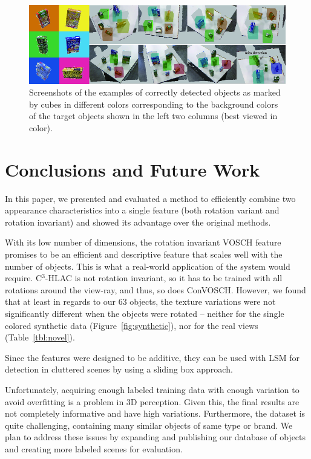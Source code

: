 \documentclass[a4paper, 10 pt, conference]{sty/ieeeconf}
\begin{document}
\begin{figure}[tb!]
  \centering
  \includegraphics[width=.99\textwidth]{figures/detection_demo/four_objects_detection.png}
  \caption{Screenshots of the examples of correctly detected objects as marked by cubes in different colors corresponding to the background colors of the target objects shown in the left two columns (best viewed in color). }
  \label{fig:correct_detected}
\end{figure}



\section{Conclusions and Future Work}
\label{sec:conclusion}

In this paper, we presented and evaluated a method to efficiently combine two
appearance characteristics into a single feature (both rotation
variant and rotation invariant) and showed its advantage over
the original methods.

With its low number of dimensions, the rotation invariant VOSCH feature
promises to be an efficient and descriptive feature that scales well with
the number of objects. This is what a real-world application of the system would
require. C$^3$-HLAC is not rotation invariant, so it has to be trained with
all rotations around the view-ray, and thus, so does ConVOSCH.
However, we found that at least in regards to our 63 objects, the texture variations
were not significantly different when the objects were rotated
-- neither for the single colored synthetic data (Figure~\ref{fig:synthetic}),
nor for the real views (Table~\ref{tbl:novel}).

Since the features were designed to be additive, they can be used with LSM for
detection in cluttered scenes by using a sliding box approach.

Unfortunately, acquiring enough labeled training data with enough variation
to avoid overfitting is a problem in 3D perception. Given this, the final results are
not completely informative and have high variations.
Furthermore, the dataset is quite challenging, containing many similar objects of same type or brand.
We plan to address these issues by expanding and publishing our database of objects
and creating more labeled scenes for evaluation.
\end{document}
